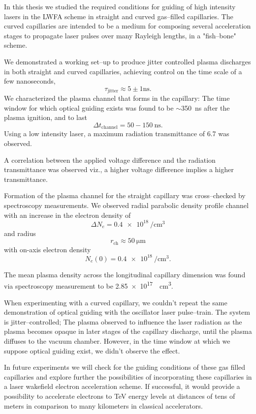 \documentclass[../main.tex]{subfiles}
\begin{document}
In this thesis we studied the required conditions for guiding of high intensity lasers in the LWFA scheme in straight and curved gas--filled capillaries. The curved capillaries are intended to be a medium for composing several acceleration stages to propagate laser pulses over many Rayleigh lengths, in a "fish--bone" scheme.

We demonstrated a working set--up to produce jitter controlled plasma discharges in both straight and curved capillaries, achieving control on the time scale of a few nanoseconds,
\begin{equation*}
    	\tau_\text{jitter}\approx 5\pm 1\si{\ns}.
\end{equation*}
We characterized the plasma channel that forms in the capillary: The time window for which optical guiding exists was found to be $\sim$\SI{350}{\ns} after the plasma ignition, and to last
\begin{equation*}
    \Delta t_\text{channel}=50-150\ \si{\ns}.
\end{equation*}
Using a low intensity laser, a maximum radiation transmittance of 6.7 was observed.

A correlation between the applied voltage difference and the radiation transmittance was observed viz., a higher voltage difference implies a higher transmittance.

Formation of the plasma channel for the straight capillary was cross--checked by spectroscopy measurements. We observed radial parabolic density profile channel with an increase in the electron density of $$\Delta N_e =\SI{0.4e18}{\per\cubic\cm}$$ and radius
$$r_\text{ch}\approx \SI{50}{\um}$$ with on-axis electron density $$N_e(0)=\SI{0.4e18}{\per\cubic\cm}.$$

The mean plasma density across the longitudinal capillary dimension was found via spectroscopy measurement to be \SI{2.85e17}{\per\cubic\cm}.

When experimenting with a curved capillary, we couldn't repeat the same demonstration of optical guiding with the oscillator laser pulse--train. The system is jitter--controlled; The plasma observed to influence the laser radiation as the plasma becomes opaque in later stages of the capillary discharge, until the plasma diffuses to the vacuum chamber. However, in the time window at which we suppose optical guiding exist, we didn't observe the effect. 

In future experiments we will check for the guiding conditions of these gas filled capillaries and explore further the possibilities of incorporating these capillaries in a laser wakefield electron acceleration scheme. If successful, it would provide a possibility to accelerate electrons to \si{\tera\eV} energy levels at distances of tens of meters in comparison to many kilometers in classical accelerators.


\end{document}
